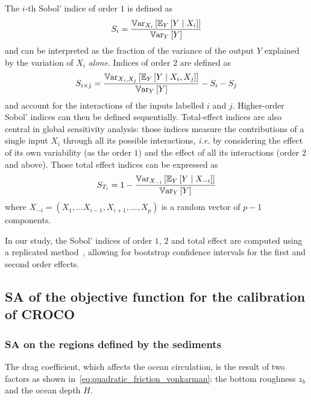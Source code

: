 \documentclass[../../Main_ManuscritThese.tex]{subfiles}
\newcommand{\zob}{z_b}
\begin{document}
The $i$-th Sobol' indice of order $1$ is defined
as~\cite{sobol_sensitivity_1993,sobol_global_2001}
\begin{equation}
  S_i = \frac{\mathbb{V}\mathrm{ar}_{X_i}\left[\mathbb{E}_{Y}\left[Y \mid X_i\right]\right]}{\mathbb{V}\mathrm{ar}_{Y}\left[Y\right]}
\end{equation}
and can be interpreted as the fraction of the variance of the output
$Y$ explained by the variation of $X_i$ \emph{alone}. Indices of
order $2$ are defined as
\begin{equation}
  S_{i\times j} = \frac{\mathbb{V}\mathrm{ar}_{X_i, X_j}\left[\mathbb{E}_{Y}\left[Y \mid X_i, X_j\right]\right]}{\mathbb{V}\mathrm{ar}_{Y}\left[Y\right]} - S_i -S_j
\end{equation}
and account for the interactions of the inputs labelled $i$ and $j$.
Higher-order Sobol' indices can then be defined
sequentially. Total-effect indices are also central in global
sensitivity analysis: those indices measure the contributions of a
single input $X_i$ through all its possible interactions,
\textit{i.e.} by considering the effect of its own variability (as the
order $1$) and the effect of all its interactions (order $2$ and
above). Those total effect indices can be expressed as
\begin{equation}
  S_{T_i} = 1 - \frac{\mathbb{V}\mathrm{ar}_{X_{-i}}\left[\mathbb{E}_{Y}\left[Y \mid X_{-i}\right]\right]}{\mathbb{V}\mathrm{ar}_{Y}\left[Y\right]}
\end{equation}
where $X_{-i} = (X_1,\dots X_{i-1},X_{i+1},\dots,X_p)$ is a random vector of $p-1$ components.

In our study, the Sobol' indices of order $1$, $2$ and total effect
are computed using a replicated
method~\cite{gilquin_making_2019,gilquin_echantillonnages_2016},
allowing for bootstrap confidence intervals for the first and second
order effects.

\subsection{SA of the objective function for the calibration of CROCO}
\subsubsection{SA on the regions defined by the sediments}
The drag coefficient, which affects the ocean circulation, is the
result of two factors as shown
in~\cref{eq:quadratic_friction_vonkarman}: the bottom roughness
$\zob$ and the ocean depth $H$.
\end{document}
